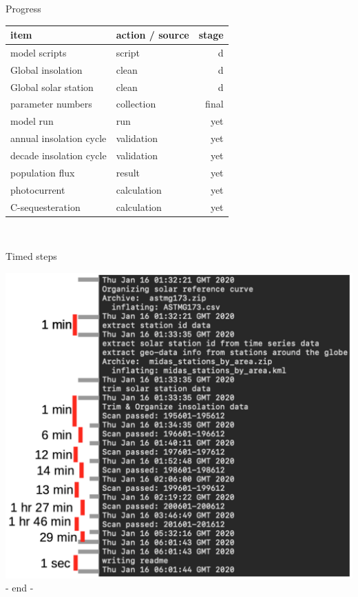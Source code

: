 \documentclass[xcolor=x11names,compress]{beamer}
\begin{document}
\begin{frame}{Progress}
    \begin{center}
        \begin{tabular}{l|lr}
            item & action / source & stage \\\hline
            model scripts & script &  d \\
            Global insolation & clean & d \\
            Global solar station & clean & d \\
            parameter numbers & collection & final \\
            model run & run & yet \\
            annual insolation cycle & validation & yet \\
            decade insolation cycle & validation & yet \\
            population flux & result & yet \\
            photocurrent & calculation & yet \\
            C-sequesteration & calculation & yet
        \end{tabular}\\
    \end{center}
\end{frame}

\begin{frame}{Timed steps}
    \begin{center}
        \includegraphics[width=.8\linewidth]{meeting/figure/timed_steps.png}\\
        \vspace{.3cm}
        - end -
    \end{center}
\end{frame}
\end{document}
